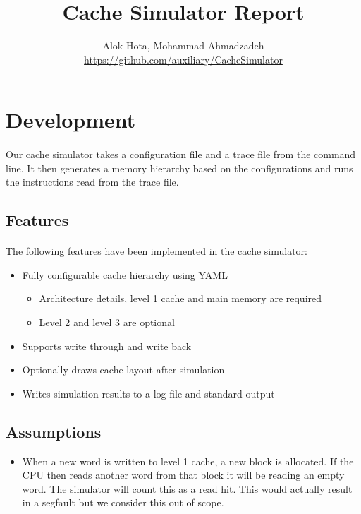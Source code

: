 \documentclass[11pt]{article}
\title{\textbf{Cache Simulator Report}}
\author{Alok Hota, Mohammad Ahmadzadeh\\\href{https://github.com/auxiliary/CacheSimulator}{https://github.com/auxiliary/CacheSimulator}}
\begin{document}
\maketitle

\section{Development}
\paragraph{}
Our cache simulator takes a configuration file and a trace file from the command line. It then generates a memory hierarchy based on the configurations and runs the instructions read from the trace file. 

\subsection{Features}
\paragraph{}
The following features have been implemented in the cache simulator:
\begin{itemize}
	\item Fully configurable cache hierarchy using YAML
		\begin{itemize}
			\item Architecture details, level 1 cache and main memory are required
			\item Level 2 and level 3 are optional
		\end{itemize}
	\item Supports write through and write back
	\item Optionally draws cache layout after simulation
	\item Writes simulation results to a log file and standard output
\end{itemize}

\subsection{Assumptions}
\begin{itemize}
	\item When a new word is written to level 1 cache, a new block is allocated. If the CPU then reads another word from that block it will be reading an empty word. The simulator will count this as a read hit. This would actually result in a segfault but we consider this out of scope. 
\end{itemize}
\end{document}
